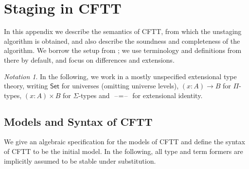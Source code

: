 \documentclass[acmsmall,screen,review,anonymous]{acmart}
\newcommand{\msf}[1]{{\mathsf{#1}}}
\newcommand{\Set}{\msf{Set}}
\newcommand{\blank}{{\mathord{\hspace{1pt}\text{--}\hspace{1pt}}}}
\theoremstyle{remark}
\newtheorem{notation}{Notation}
\begin{document}
\appendices
\section{Staging in CFTT}\label{appendix:A}

In this appendix we describe the semantics of CFTT, from which the unstaging
algorithm is obtained, and also describe the soundness and completeness of the
algorithm. We borrow the setup from \cite{staged2ltt}; we use terminology and
definitions from there by default, and focus on differences and extensions.

\begin{notation} In the following, we work in a mostly unspecified extensional
type theory, writing $\Set$ for universes (omitting universe levels), $(x : A) \to B$
for $\Pi$-types, $(x : A) \times B$ for $\Sigma$-types and $\blank\!=\!\blank$ for
extensional identity.

\end{notation}

\subsection{Models and Syntax of CFTT}

We give an algebraic \cite{TODO} specification for the models of CFTT and define
the syntax of CFTT to be the initial model. In the following, all type and term
formers are implicitly assumed to be stable under substitution.
\end{document}
